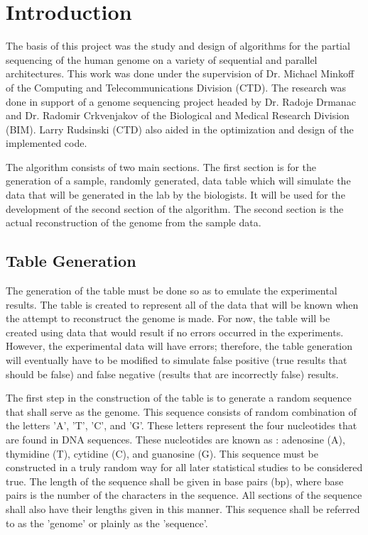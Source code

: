 \section{Introduction}

The basis of this project was the study and design of algorithms for the
partial sequencing of the human genome on a variety of sequential and
parallel architectures.  This work was done under the supervision
of Dr. Michael Minkoff of the Computing and Telecommunications Division
(CTD).  The research was done in support of a genome sequencing project
headed by Dr. Radoje Drmanac and Dr. Radomir Crkvenjakov of the Biological
and Medical Research Division (BIM).  Larry Rudsinski (CTD) also aided in
the optimization and design of the implemented code.

The algorithm consists of two main sections.  The first section is for the
generation of a sample, randomly generated, data table which will simulate
the data that will be generated in the lab by the biologists.  It will be used
for the development of the second section of the algorithm.  The second
section is the actual reconstruction of the genome from the sample data.

\subsection{Table Generation}
The generation of the table must be done so as to emulate the experimental
results.  The table is created to represent all of the data that will be
known when the attempt to reconstruct the genome is made.  For now, the
table will be created using data that would result if no errors occurred in
the experiments.  However, the experimental data will have errors;
therefore, the table generation will eventually have to be modified to
simulate false positive (true results that should be false) and false
negative (results that are incorrectly false) results.

The first step in the construction of the table is to generate a
random sequence that shall serve as the genome.  This sequence consists of
random combination of the letters 'A', 'T', 'C', and 'G'.  These letters
represent the four nucleotides that are found in DNA sequences.  These
nucleotides are known as : adenosine (A), thymidine (T), cytidine (C), and
guanosine (G).  This sequence must be constructed in a truly random way
for all later statistical studies to be considered true.  The length of the
sequence shall be given in base pairs (bp), where base pairs is the number
of the characters in the sequence.  All sections of the sequence
shall also have their lengths given in this
manner.  This sequence shall be referred to as the 'genome' or plainly
as the 'sequence'.


